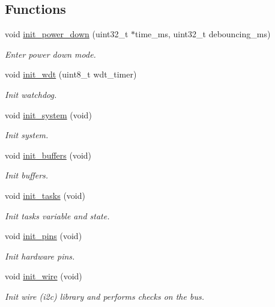 \subsection*{Functions}
\begin{DoxyCompactItemize}
\item 
void \hyperlink{i2c-rain_8h_afb98a0f07c30784284f48271ffe02b97}{init\+\_\+power\+\_\+down} (uint32\+\_\+t $\ast$time\+\_\+ms, uint32\+\_\+t debouncing\+\_\+ms)
\begin{DoxyCompactList}\small\item\em Enter power down mode. \end{DoxyCompactList}\item 
void \hyperlink{i2c-rain_8h_a980e73df66b14b1190bc25da430a4f12}{init\+\_\+wdt} (uint8\+\_\+t wdt\+\_\+timer)
\begin{DoxyCompactList}\small\item\em Init watchdog. \end{DoxyCompactList}\item 
void \hyperlink{i2c-rain_8h_a348d23d5899ce59d18975284dfb0afc0}{init\+\_\+system} (void)
\begin{DoxyCompactList}\small\item\em Init system. \end{DoxyCompactList}\item 
void \hyperlink{i2c-rain_8h_ad438327c9cf783bd9c519ce8b8ef3bfa}{init\+\_\+buffers} (void)
\begin{DoxyCompactList}\small\item\em Init buffers. \end{DoxyCompactList}\item 
void \hyperlink{i2c-rain_8h_a2aae2290a141fddcea3fb6009acbb445}{init\+\_\+tasks} (void)
\begin{DoxyCompactList}\small\item\em Init tasks variable and state. \end{DoxyCompactList}\item 
void \hyperlink{i2c-rain_8h_aa9c113540346b54d49b2a596e6ba8480}{init\+\_\+pins} (void)
\begin{DoxyCompactList}\small\item\em Init hardware pins. \end{DoxyCompactList}\item 
void \hyperlink{i2c-rain_8h_a7c21452937863fa02a29654247eef09b}{init\+\_\+wire} (void)
\begin{DoxyCompactList}\small\item\em Init wire (i2c) library and performs checks on the bus. \end{DoxyCompactList}\item 

\end{DoxyCompactItemize}
